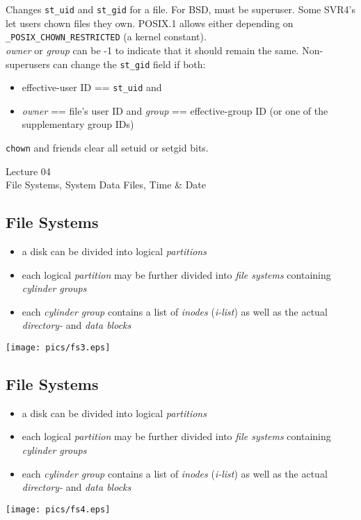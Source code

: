 \documentclass[xga]{xdvislides}
\begin{document}
Changes {\tt st\_uid} and {\tt st\_gid} for a file. For BSD, must be
superuser. Some SVR4's let users chown files they own. POSIX.1 allows either
depending on {\tt \_POSIX\_CHOWN\_RESTRICTED} (a kernel constant).
\\

{\em owner} or {\em group} can be -1 to indicate that it should remain the same.
Non-superusers can change the {\tt st\_gid} field if both:
\begin{itemize}
	\item effective-user ID == {\tt st\_uid} and
	\item {\em owner} == file's user ID and {\em group} == effective-group ID
		(or one of the supplementary group IDs)
\end{itemize}
\addvspace{.5in}
{\tt chown} and friends clear all setuid or setgid bits.

\newpage

\vspace*{\fill}
\begin{center}
  \Hugesize
    Lecture 04
	\hspace*{5mm}\blueline\\ [1em]
	File Systems, System Data Files, Time \& Date
  \Normalsize
\end{center}
\vspace*{\fill}

\subsection{File Systems}
\begin{itemize}
	\item a disk can be divided into logical {\em partitions}
	\item each logical {\em partition} may be further divided into
		{\em file systems} containing {\em cylinder groups}
	\item each {\em cylinder group} contains a list of {\em inodes} ({\em i-list})
		as well as the actual {\em directory-} and {\em data blocks}
\end{itemize}
\texttt{[image: pics/fs3.eps]}

\subsection{File Systems}
\begin{itemize}
	\item a disk can be divided into logical {\em partitions}
	\item each logical {\em partition} may be further divided into
		{\em file systems} containing {\em cylinder groups}
	\item each {\em cylinder group} contains a list of {\em inodes} ({\em i-list})
		as well as the actual {\em directory-} and {\em data blocks}
\end{itemize}
\texttt{[image: pics/fs4.eps]}
\end{document}
